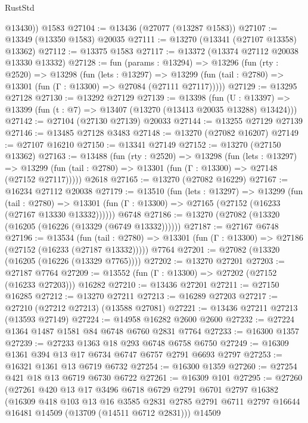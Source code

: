 \begin{lexlean}{RustStd}
\begin{coremodule}
        @13430))
    @1583
@27104 := @13436 (@27077 (@13287 @1583))
@27107 := @13349 (@13350 @1583) @20035
@27111 := @13270 (@13341 (@27107 @13358) @13362)
@27112 := @13375 @1583
@27117 := @13372 (@13374 @27112 @20038 @13330 @13332)
@27128 := fun (params : @13294) =>
  @13296
    (fun (rty : @2520) =>
    @13298
      (fun (lets : @13297) =>
      @13299 (fun (tail : @2780) => @13301 (fun (Γ : @13300) => @27084 (@27111 @27117)))))
@27129 := @13295 @27128
@27130 := @13292 @27129
@27139 := @13398
    (fun (U : @13397) => @13399 (fun (t : @7) => @13407 (@13270 (@13413 @20035 @13288) @13424)))
@27142 := @27104 (@27130 @27139) @20033
@27144 := @13255 @27129 @27139
@27146 := @13485 @27128 @3483
@27148 := @13270 (@27082 @16207)
@27149 := @27107 @16210
@27150 := @13341 @27149
@27152 := @13270 (@27150 @13362)
@27163 := @13488
    (fun (rty : @2520) =>
    @13298
      (fun (lets : @13297) =>
      @13299 (fun (tail : @2780) => @13301 (fun (Γ : @13300) => @27148 (@27152 @27117)))))
    @2618
@27165 := @13270 (@27082 @16229)
@27167 := @16234 @27112 @20038
@27179 := @13510
    (fun (lets : @13297) =>
    @13299
      (fun (tail : @2780) =>
      @13301 (fun (Γ : @13300) => @27165 (@27152 (@16233 (@27167 @13330 @13332))))))
    @6748
@27186 := @13270 (@27082 (@13320 (@16205 (@16226 (@13329 (@6749 @13332))))))
@27187 := @27167 @6748
@27196 := @13534
    (fun (tail : @2780) => @13301 (fun (Γ : @13300) => @27186 (@27152 (@16233 (@27187 @13332)))))
    @7764
@27201 := @27082 (@13320 (@16205 (@16226 (@13329 @7765))))
@27202 := @13270 @27201
@27203 := @27187 @7764
@27209 := @13552 (fun (Γ : @13300) => @27202 (@27152 (@16233 @27203))) @16282
@27210 := @13436 @27201
@27211 := @27150 @16285
@27212 := @13270 @27211
@27213 := @16289 @27203
@27217 := @27210 (@27212 @27213) (@13588 @27081)
@27221 := @13436 @27211 @27213 (@13593 @27149)
@27224 := @14958 @16282 @2600 @2600
@27232 := @27224 @1364 @1487 @1581 @84 @6748 @6760 @2831 @7764
@27233 := @16300 @1357
@27239 := @27233 @1363 @18 @293 @6748 @6758 @6750
@27249 := @16309 @1361 @394 @13 @17 @6734 @6747 @6757 @2791 @6693 @2797
@27253 := @16321 @1361 @13 @6719 @6732
@27254 := @16300 @1359
@27260 := @27254 @421 @18 @13 @6719 @6730 @6722
@27261 := @16309 @101
@27295 := @27260
    (@27261
      @420
      @13
      @17
      @3496
      @6718
      @6729
      @2791
      @6701
      @2797
      @16382
      (@16309
        @418
        @103
        @13
        @16
        @3585
        @2831
        @2785
        @2791
        @6711
        @2797
        @16644
        @16481
        @14509
        (@13709 (@14511 @6712 @2831)))
      @14509

\end{coremodule}
\end{lexlean}

